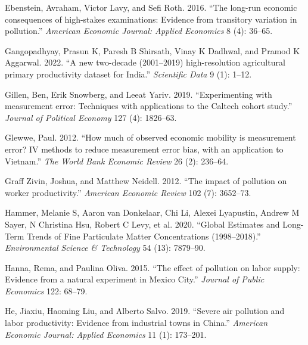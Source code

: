 \documentclass[
]{article}
\newlength{\cslhangindent}
\newlength{\cslentryspacingunit} %
\newenvironment{CSLReferences}[2] %
 {%
  \setlength{\parindent}{0pt}
  \ifodd #1
  \let\oldpar\par
  \def\par{\hangindent=\cslhangindent\oldpar}
  \fi
  \setlength{\parskip}{#2\cslentryspacingunit}
 }%
 {}
\begin{document}
\begin{CSLReferences}{1}{0}
\leavevmode{}%
Ebenstein, Avraham, Victor Lavy, and Sefi Roth. 2016. {``{The long-run economic consequences of high-stakes examinations: Evidence from transitory variation in pollution}.''} \emph{{American Economic Journal: Applied Economics}} 8 (4): 36--65.

\leavevmode{}%
Gangopadhyay, Prasun K, Paresh B Shirsath, Vinay K Dadhwal, and Pramod K Aggarwal. 2022. {``{A new two-decade (2001--2019) high-resolution agricultural primary productivity dataset for India}.''} \emph{{Scientific Data}} 9 (1): 1--12.

\leavevmode{}%
Gillen, Ben, Erik Snowberg, and Leeat Yariv. 2019. {``{Experimenting with measurement error: Techniques with applications to the Caltech cohort study}.''} \emph{{Journal of Political Economy}} 127 (4): 1826--63.

\leavevmode{}%
Glewwe, Paul. 2012. {``{How much of observed economic mobility is measurement error? IV methods to reduce measurement error bias, with an application to Vietnam}.''} \emph{{The World Bank Economic Review}} 26 (2): 236--64.

\leavevmode{}%
Graff Zivin, Joshua, and Matthew Neidell. 2012. {``{The impact of pollution on worker productivity}.''} \emph{{American Economic Review}} 102 (7): 3652--73.

\leavevmode{}%
Hammer, Melanie S, Aaron van Donkelaar, Chi Li, Alexei Lyapustin, Andrew M Sayer, N Christina Hsu, Robert C Levy, et al. 2020. {``Global Estimates and Long-Term Trends of Fine Particulate Matter Concentrations (1998--2018).''} \emph{{Environmental Science \& Technology}} 54 (13): 7879--90.

\leavevmode{}%
Hanna, Rema, and Paulina Oliva. 2015. {``{The effect of pollution on labor supply: Evidence from a natural experiment in Mexico City}.''} \emph{{Journal of Public Economics}} 122: 68--79.

\leavevmode{}%
He, Jiaxiu, Haoming Liu, and Alberto Salvo. 2019. {``{Severe air pollution and labor productivity: Evidence from industrial towns in China}.''} \emph{{American Economic Journal: Applied Economics}} 11 (1): 173--201.


\end{CSLReferences}
\end{document}
